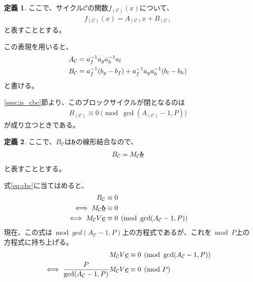 \documentclass[a4paper,11pt,dvipdfmx]{jsarticle}
\theoremstyle{definition}
\newtheorem{definition}{定義}[section]
\begin{document}
\begin{definition}
  ここで、サイクル$\mathcal{C}$の関数$f_(\mathcal{C})(x)$について、
  \begin{align}
    f_(\mathcal{C})(x) = A_(\mathcal{C})x+B_(\mathcal{C})
  \end{align}
  と表すこととする。
\end{definition}

この表現を用いると、
\begin{align}
  A_{\mathcal{C}} &= a_{f}^{-1} a_{g} a_{h}^{-1} a_{l}\\B_{\mathcal{C}} &= a_{f}^{-1}(b_{g} - b_{f}) + a_{f}^{-1} a_{g} a_{h}^{-1} (b_{l} - b_{h})\\
\end{align}
と書ける。

\ref{ssec:is_cbc}節より、このブロックサイクルが閉となるのは
\begin{align}
  B_(\mathcal{C}) \equiv 0 \pmod{\gcd(A_(\mathcal{C})-1, P)}
\end{align}
が成り立つときである。

\begin{definition}
  ここで、$B_{\mathcal{C}}$は$\underline{\bm{b}}$の線形結合なので、
  \begin{align}
    B_{\mathcal{C}} = M_{\mathcal{C}}\underline{\bm{b}}
  \end{align}
  と表すこととする。
\end{definition}

式\eqref{eq:cbc}に当てはめると、
\begin{align}
  B_{\mathcal{C}} &\equiv 0\\
  \iff M_{\mathcal{C}}\underline{\bm{b}} &\equiv 0\\
  \iff M_{\mathcal{C}}V\underline{\bm{c}} &\equiv 0 \pmod{\gcd(A_{\mathcal{C}}-1, P)}
\end{align}
現在、この式は$\bmod{gcd(A_{\mathcal{C}}-1, P)}$上の方程式であるが、これを$\bmod{P}$上の方程式に持ち上げる。
\begin{align}
  M_{\mathcal{C}}V\underline{\bm{c}} &\equiv 0 \pmod{\gcd(A_{\mathcal{C}}-1, P)}\\
  \iff \frac{P}{\gcd(A_{\mathcal{C}}-1, P)}M_{\mathcal{C}}V\underline{\bm{c}} &\equiv 0 \pmod{P}
\end{align}
\end{document}

